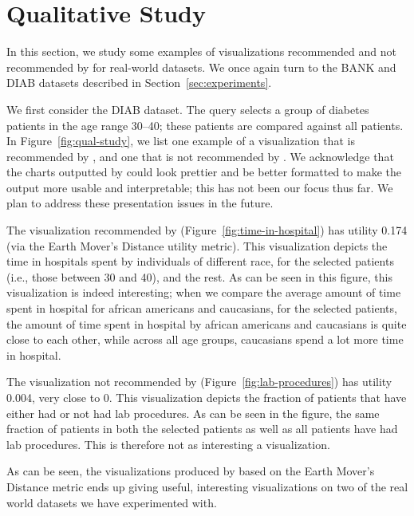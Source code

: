 
\section{Qualitative Study}\label{sec:example-viz}

In this section, we study some examples of visualizations recommended and
not recommended by \VizRecDB for real-world datasets.
We once again turn to the BANK and DIAB datasets described in 
Section~\ref{sec:experiments}.

We first consider the DIAB dataset. 
The query selects a group of diabetes patients in the age range 30--40;
these patients are compared against all patients.
In Figure~\ref{fig:qual-study}, we list one example of a visualization
that is recommended by \VizRecDB, and one that is not recommended by \VizRecDB.
We acknowledge that the charts outputted by \VizRecDB could look prettier and be better
formatted to make the output more usable and interpretable; this has not been our focus thus far. 
We plan to address these presentation issues in the future.

The visualization recommended by \VizRecDB (Figure~\ref{fig:time-in-hospital}) has utility 0.174 (via
the Earth Mover's Distance utility metric).
This visualization depicts the time in hospitals spent by
individuals of different race, for the selected patients
(i.e., those between 30 and 40), and
the rest. 
As can be seen in this figure, this visualization is indeed interesting;
when we compare the average amount of time spent in hospital 
for african americans and caucasians, 
for the selected patients, the amount of time spent in hospital
by african americans and caucasians is quite close to each other,
while across all age groups, caucasians spend a lot more time
in hospital.

The visualization not recommended by \VizRecDB (Figure~\ref{fig:lab-procedures}) has utility 0.004, very close to 0.
This visualization depicts the fraction of patients that 
have either had or not had lab procedures. 
As can be seen in the figure, the same fraction of patients in
both the selected patients as well as all patients
have had lab procedures.
This is therefore not as interesting a visualization.

As can be seen, 
the visualizations produced by \VizRecDB based on the Earth Mover's Distance
metric ends up giving useful, interesting visualizations on two of
the real world datasets we have experimented with.



